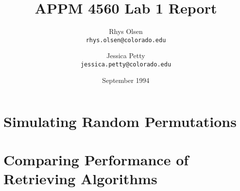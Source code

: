 \documentclass{article}
\title{APPM 4560 Lab 1 Report}
\author{
  Rhys Olsen\\
  \texttt{rhys.olsen@colorado.edu}
  \and
  Jessica Petty\\
  \texttt{jessica.petty@colorado.edu}
}
\date{September 1994}
\begin{document}
\maketitle
\section{Simulating Random Permutations}
\section{Comparing Performance of Retrieving Algorithms}
\end{document}
